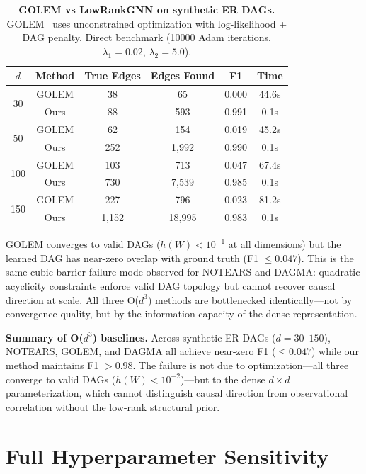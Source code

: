 \documentclass{article}
\theoremstyle{definition}
\begin{document}
\begin{table}[H]
\begin{table}[H]
\centering
\caption{\textbf{GOLEM vs LowRankGNN on synthetic ER DAGs.} GOLEM~\citep{ng2020golem} uses unconstrained optimization with log-likelihood + DAG penalty. Direct benchmark (10000 Adam iterations, $\lambda_1=0.02$, $\lambda_2=5.0$).}
\label{tab:golem}
\small
\begin{tabular}{cccccc}
\toprule
$d$ & Method & True Edges & Edges Found & F1 & Time \\
\midrule
\multirow{2}{*}{30} & GOLEM & 38 & 65 & 0.000 & 44.6s \\
& Ours & 88 & 593 & 0.991 & 0.1s \\
\midrule
\multirow{2}{*}{50} & GOLEM & 62 & 154 & 0.019 & 45.2s \\
& Ours & 252 & 1,992 & 0.990 & 0.1s \\
\midrule
\multirow{2}{*}{100} & GOLEM & 103 & 713 & 0.047 & 67.4s \\
& Ours & 730 & 7,539 & 0.985 & 0.1s \\
\midrule
\multirow{2}{*}{150} & GOLEM & 227 & 796 & 0.023 & 81.2s \\
& Ours & 1,152 & 18,995 & 0.983 & 0.1s \\
\bottomrule
\end{tabular}

GOLEM converges to valid DAGs ($h(W) < 10^{-1}$ at all dimensions) but the learned DAG has near-zero overlap with ground truth (F1 $\le 0.047$). This is the same cubic-barrier failure mode observed for NOTEARS and DAGMA: quadratic acyclicity constraints enforce valid DAG topology but cannot recover causal direction at scale. All three O($d^3$) methods are bottlenecked identically---not by convergence quality, but by the information capacity of the dense representation.
\end{table}

\textbf{Summary of O($d^3$) baselines.} Across synthetic ER DAGs ($d=30$--$150$), NOTEARS, GOLEM, and DAGMA all achieve near-zero F1 ($\le 0.047$) while our method maintains F1 $> 0.98$. The failure is not due to optimization---all three converge to valid DAGs ($h(W) < 10^{-2}$)---but to the dense $d \times d$ parameterization, which cannot distinguish causal direction from observational correlation without the low-rank structural prior.
\end{table}

\section{Full Hyperparameter Sensitivity}
\label{app:sensitivity}
\end{document}
